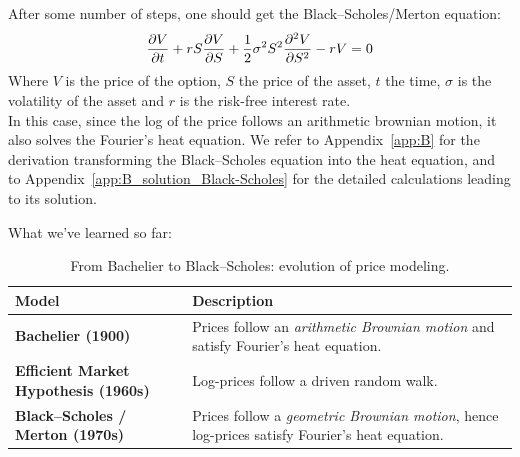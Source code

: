 After some number of steps, one should get the Black--Scholes/Merton equation:
\begin{equation} \label{eq:Black–Scholes}
    \pdv{V}{t} + rS \pdv{V}{S} + \frac{1}{2} \sigma^2 S^2 \pdv[2]{V}{S} - rV = 0
\end{equation}
Where $V$ is the price of the option, $S$ the price of the asset, $t$ the time, $\sigma$ is the volatility of the asset and $r$ is the risk-free interest rate. \\

In this case, since the log of the price follows an arithmetic brownian motion, it also solves the Fourier's heat equation.
We refer to Appendix~\ref{app:B} for the derivation transforming the Black--Scholes equation into the heat equation, and to Appendix~\ref{app:B_solution_Black-Scholes} for the detailed calculations leading to its solution.

What we've learned so far:

\begin{table}[H]
\centering
{}
\begin{tabular}{@{}p{3.8cm}p{8.2cm}@{}}
\toprule
\rowcolor{gray!15}
\textbf{Model} & \textbf{Description} \\ \midrule
\textbf{Bachelier (1900)} &
Prices follow an \emph{arithmetic Brownian motion} and satisfy Fourier's heat equation. \\[2pt]
\textbf{Efficient Market Hypothesis (1960s)} &
Log-prices follow a driven random walk. \\[2pt]
\textbf{Black–Scholes / Merton (1970s)} &
Prices follow a \emph{geometric Brownian motion}, hence log-prices satisfy Fourier's heat equation. \\ 
\bottomrule
\end{tabular}
\caption{From Bachelier to Black–Scholes: evolution of price modeling.}
\end{table}

